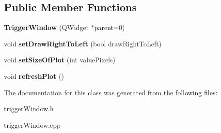 \subsection*{Public Member Functions}
\begin{DoxyCompactItemize}
\item 
\mbox{\label{class_trigger_window_ad9da4bdf5f844a35fddea81bcd2979a3}} 
{\bfseries Trigger\+Window} (Q\+Widget $\ast$parent=0)
\item 
\mbox{\label{class_trigger_window_a1028700d4a2317d7474f56142011dd03}} 
void {\bfseries set\+Draw\+Right\+To\+Left} (bool draw\+Right\+To\+Left)
\item 
\mbox{\label{class_trigger_window_aecea83091dea4a3ce7fbda4b3300d144}} 
void {\bfseries set\+Size\+Of\+Plot} (int value\+Pixels)
\item 
\mbox{\label{class_trigger_window_a23d01eff1c69090972649f1f1db6f55d}} 
void {\bfseries refresh\+Plot} ()
\end{DoxyCompactItemize}


The documentation for this class was generated from the following files\+:\begin{DoxyCompactItemize}
\item 
trigger\+Window.\+h\item 
trigger\+Window.\+cpp\end{DoxyCompactItemize}

